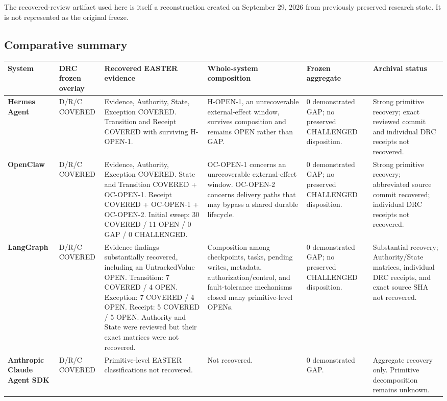 \documentclass[11pt]{article}
\begin{document}
The recovered-review artifact used here is itself a reconstruction created on September 29, 2026 from previously preserved research state. It is not represented as the original freeze.

\subsection{Comparative summary}

\begin{table}[htbp]
\centering
\small
\begin{tabularx}{\textwidth}{X X X X X X}
\toprule
System & DRC frozen overlay & Recovered EASTER evidence & Whole-system composition & Frozen aggregate & Archival status \\
\midrule
\textbf{Hermes Agent} & D/R/C COVERED & Evidence, Authority, State, Exception COVERED. Transition and Receipt COVERED with surviving H-OPEN-1. & H-OPEN-1, an unrecoverable external-effect window, survives composition and remains OPEN rather than GAP. & 0 demonstrated GAP; no preserved CHALLENGED disposition. & Strong primitive recovery; exact reviewed commit and individual DRC receipts not recovered. \\
\textbf{OpenClaw} & D/R/C COVERED & Evidence, Authority, Exception COVERED. State and Transition COVERED + OC-OPEN-1. Receipt COVERED + OC-OPEN-1 + OC-OPEN-2. Initial sweep: 30 COVERED / 11 OPEN / 0 GAP / 0 CHALLENGED. & OC-OPEN-1 concerns an unrecoverable external-effect window. OC-OPEN-2 concerns delivery paths that may bypass a shared durable lifecycle. & 0 demonstrated GAP; no preserved CHALLENGED disposition. & Strong primitive recovery; abbreviated source commit recovered; individual DRC receipts not recovered. \\
\textbf{LangGraph} & D/R/C COVERED & Evidence findings substantially recovered, including an UntrackedValue OPEN. Transition: 7 COVERED / 4 OPEN. Exception: 7 COVERED / 4 OPEN. Receipt: 5 COVERED / 5 OPEN. Authority and State were reviewed but their exact matrices were not recovered. & Composition among checkpoints, tasks, pending writes, metadata, authorization/control, and fault-tolerance mechanisms closed many primitive-level OPENs. & 0 demonstrated GAP; no preserved CHALLENGED disposition. & Substantial recovery; Authority/State matrices, individual DRC receipts, and exact source SHA not recovered. \\
\textbf{Anthropic Claude Agent SDK} & D/R/C COVERED & Primitive-level EASTER classifications not recovered. & Not recovered. & 0 demonstrated GAP. & Aggregate recovery only. Primitive decomposition remains unknown. \\

\end{tabularx}
\end{table}
\end{document}
